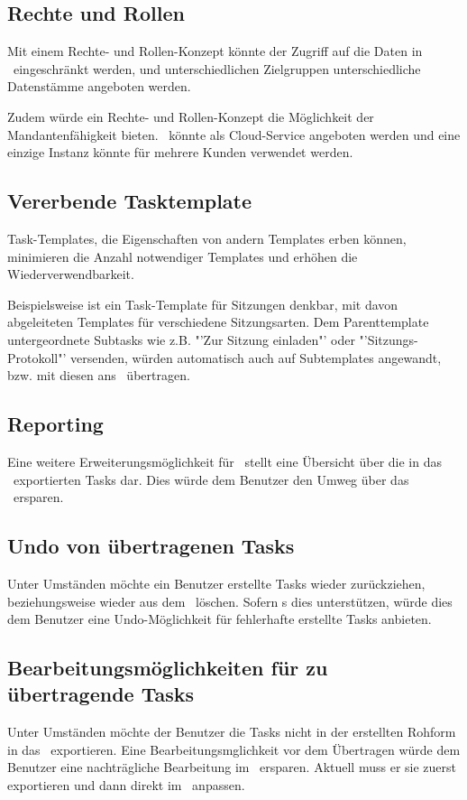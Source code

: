 		\subsection{Rechte und Rollen}
			Mit einem Rechte- und Rollen-Konzept könnte der Zugriff auf die Daten in \eeppi\ eingeschränkt werden,
			und unterschiedlichen Zielgruppen unterschiedliche Datenstämme angeboten werden.
			
			Zudem würde ein Rechte- und Rollen-Konzept die Möglichkeit der Mandantenfähigkeit bieten.
			\eeppi\ könnte als Cloud-Service angeboten werden und eine einzige Instanz könnte für mehrere Kunden verwendet werden.
			
		
		\subsection{Vererbende Tasktemplate}
			Task-Templates, die Eigenschaften von andern Templates erben können, 
			minimieren die Anzahl notwendiger Templates und erhöhen die Wiederverwendbarkeit.
			
			Beispielsweise ist ein Task-Template für Sitzungen denkbar, mit
			davon abgeleiteten Templates für verschiedene Sitzungsarten.
			Dem Parenttemplate untergeordnete Subtasks wie z.B. "'Zur Sitzung einladen"' oder "'Sitzungs-Protokoll"' versenden, würden automatisch auch auf Subtemplates angewandt, bzw. mit diesen ans \ppt\ übertragen.
			
		
		\subsection{Reporting}
			Eine weitere Erweiterungsmöglichkeit für \eeppi\ stellt eine Übersicht über die in das \ppt\ exportierten Tasks dar.
			Dies würde dem Benutzer den Umweg über das \ppt\ ersparen.
		
		
		\subsection{Undo von übertragenen Tasks}
			Unter Umständen möchte ein Benutzer erstellte Tasks wieder zurückziehen,
			beziehungsweise wieder aus dem \ppt\ löschen.
			Sofern \ppt s dies unterstützen, würde dies dem Benutzer eine Undo-Möglichkeit für fehlerhafte erstellte Tasks anbieten.
		
		
		\subsection{Bearbeitungsmöglichkeiten für zu übertragende Tasks}
			Unter Umständen möchte der Benutzer die Tasks nicht in der erstellten Rohform in das \ppt\ exportieren.
			Eine Bearbeitungsmglichkeit vor dem Übertragen würde dem Benutzer eine nachträgliche Bearbeitung im \ppt\ ersparen.
			Aktuell muss er sie zuerst exportieren und dann direkt im \ppt\ anpassen.
			
